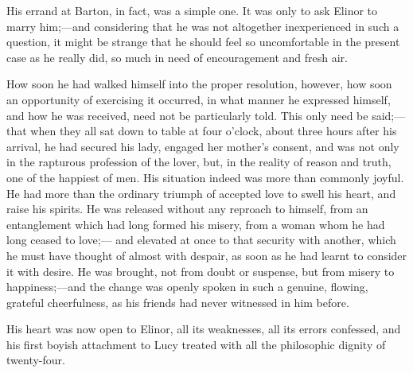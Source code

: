 His errand at Barton, in fact, was a simple one.
It was only to ask Elinor to marry him;---and considering
that he was not altogether inexperienced in such a question,
it might be strange that he should feel so uncomfortable
in the present case as he really did, so much in need of
encouragement and fresh air.

How soon he had walked himself into the proper
resolution, however, how soon an opportunity of exercising
it occurred, in what manner he expressed himself,
and how he was received, need not be particularly told.
This only need be said;---that when they all sat down to
table at four o'clock, about three hours after his arrival,
he had secured his lady, engaged her mother's consent,
and was not only in the rapturous profession of
the lover, but, in the reality of reason and truth,
one of the happiest of men.  His situation indeed was
more than commonly joyful.  He had more than the ordinary
triumph of accepted love to swell his heart, and raise
his spirits.  He was released without any reproach
to himself, from an entanglement which had long formed
his misery, from a woman whom he had long ceased to love;---%
and elevated at once to that security with another,
which he must have thought of almost with despair,
as soon as he had learnt to consider it with desire.
He was brought, not from doubt or suspense, but from
misery to happiness;---and the change was openly spoken
in such a genuine, flowing, grateful cheerfulness,
as his friends had never witnessed in him before.

His heart was now open to Elinor, all its weaknesses,
all its errors confessed, and his first boyish attachment
to Lucy treated with all the philosophic dignity of twenty-four.

